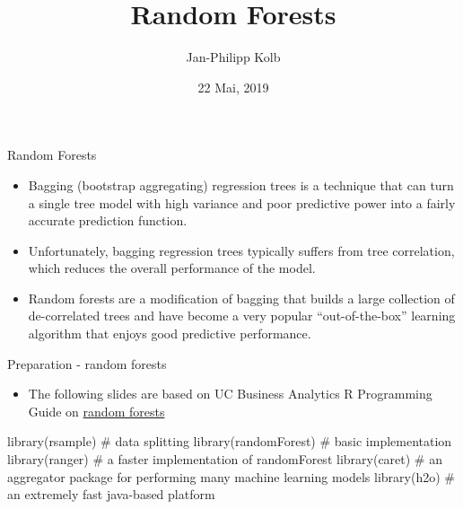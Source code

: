 \documentclass[
  10pt,
  ignorenonframetext,
]{beamer}
\title{Random Forests}
\author{Jan-Philipp Kolb}
\date{22 Mai, 2019}
\newenvironment{Shaded}{}{}
\newcommand{\CommentTok}[1]{\textcolor[rgb]{0.00,0.50,0.00}{#1}}
\newcommand{\KeywordTok}[1]{\textcolor[rgb]{0.00,0.00,1.00}{#1}}
\newcommand{\NormalTok}[1]{#1}
\providecommand{\tightlist}{%
  \setlength{\itemsep}{0pt}\setlength{\parskip}{0pt}}
\begin{document}
\frame{\titlepage}

\begin{frame}{Random Forests}
\protect\hypertarget{random-forests}{}

\begin{itemize}
\tightlist
\item
  Bagging (bootstrap aggregating) regression trees is a technique that
  can turn a single tree model with high variance and poor predictive
  power into a fairly accurate prediction function.
\item
  Unfortunately, bagging regression trees typically suffers from tree
  correlation, which reduces the overall performance of the model.
\item
  Random forests are a modification of bagging that builds a large
  collection of de-correlated trees and have become a very popular
  ``out-of-the-box'' learning algorithm that enjoys good predictive
  performance.
\end{itemize}

\end{frame}

\begin{frame}[fragile]{Preparation - random forests}
\protect\hypertarget{preparation---random-forests}{}

\begin{itemize}
\tightlist
\item
  The following slides are based on UC Business Analytics R Programming
  Guide on \href{http://uc-r.github.io/random_forests}{random forests}
\end{itemize}

\begin{Shaded}
\begin{Highlighting}[]
\KeywordTok{library}\NormalTok{(rsample)      }\CommentTok{# data splitting }
\KeywordTok{library}\NormalTok{(randomForest) }\CommentTok{# basic implementation}
\KeywordTok{library}\NormalTok{(ranger)       }\CommentTok{# a faster implementation of randomForest}
\KeywordTok{library}\NormalTok{(caret)        }\CommentTok{# an aggregator package for performing many machine learning models}
\KeywordTok{library}\NormalTok{(h2o)          }\CommentTok{# an extremely fast java-based platform}
\end{Highlighting}
\end{Shaded}

\end{frame}
\end{document}
